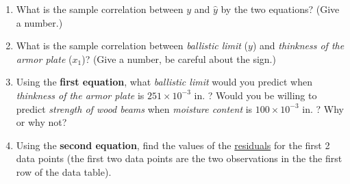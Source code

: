 \documentclass[11pt]{article}
\begin{document}
{\begin{enumerate}[label = (\alph*)]
\vskip 1cm

\item What is the sample correlation between $y$ and $\hat{y}$ by the two
	equations? (Give a number.)

\hfill {}

\hfill {}

\vskip 1cm






\item What is the sample correlation between \emph{ballistic limit} ($y$)
	and \emph{thinkness of the armor plate} ($x_1$)? (Give a number, be
careful about the sign.)

\hfill {}

\vskip 1cm
\clearpage
\item Using the {\bf first equation}, what \emph{ballistic limit} would you
	predict when \emph{thinkness of the armor plate} is $251 \times
	10^{-3}$ in. ? Would you be willing to
predict \emph{strength of wood beams} when \emph{moisture content}
is $100 \times 10^{-3}$ in. ? Why or why not?
\vskip 1cm
\hfill {}

\vskip 1cm

\hfill {}

\vskip 0.5cm



\item Using the {\bf second equation}, find the values of the
	\underline{residuals} for the
	first 2 data points (the first two data points are the
	two observations in the the first row of the
	data table).

\vskip 1cm

\hfill {}

\vskip 1cm



\end{enumerate}}
\end{document}
